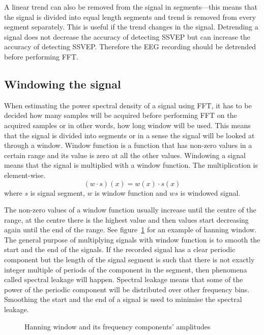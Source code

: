 A linear trend can also be removed from the signal in segments---this means that the signal is divided into equal length segments and trend is removed from every segment separately. This is useful if the trend changes in the signal. Detrending a signal does not decrease the accuracy of detecting \gls{SSVEP} but can increase the accuracy of detecting \gls{SSVEP}. Therefore the \gls{EEG} recording should be detrended before performing \gls{FFT}.

\subsection{Windowing the signal}

When estimating the \gls{power spectral density} of a signal using \gls{FFT}, it has to be decided how many samples will be acquired before performing \gls{FFT} on the acquired samples or in other words, how long window will be used. This means that the signal is divided into segments or in a sense the signal will be looked at through a window. Window function is a function that has non-zero values in a certain range and its value is zero at all the other values. Windowing a signal means that the signal is multiplied with a window function. The multiplication is element-wise.
\begin{equation}
	(w\cdot s)(x)=w(x)\cdot s(x)
\end{equation}
where $s$ is signal segment, $w$ is window function and $ws$ is windowed signal.

The non-zero values of a window function usually increase until the centre of the range, at the centre there is the highest value and then values start decreasing again until the end of the range. See figure~\ref{fig:hanning_window} for an example of hanning window. The general purpose of multiplying signals with window function is to smooth the start and the end of the signals. If the recorded signal has a clear periodic component but the length of the signal segment is such that there is not exactly integer multiple of periods of the component in the segment, then phenomena called spectral leakage will happen. Spectral leakage means that some of the power of the periodic component will be distributed over other \glspl{frequency bin}. Smoothing the start and the end of a signal is used to minimise the spectral leakage.

\begin{figure}[h!]
	
	\caption{Hanning window and its frequency components' amplitudes}
	\label{fig:hanning_window}
\end{figure}

